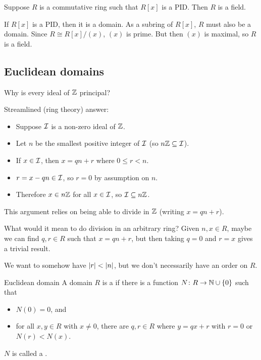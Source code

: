 \documentclass[12pt,letterpaper]{report}
\begin{document}
\begin{cor}{}{}
  Suppose $R$ is a commutative ring such that $R[x]$ is a PID.
  Then $R$ is a field.
\end{cor}

\begin{thmproof}
  If $R[x]$ is a PID, then it is a domain.
  As a subring of $R[x]$, $R$ must also be a domain.
  Since $R \cong R[x]/(x)$, $(x)$ is prime.
  But then $(x)$ is maximal, so $R$ is a field.
\end{thmproof}

\pagebreak
\subsection{Euclidean domains}

Why is every ideal of $\mathbb{Z}$ principal?

Streamlined (ring theory) answer:
\begin{itemize}
  \item Suppose $\mathcal{I}$ is a non-zero ideal of $\mathbb{Z}$.
  \item Let $n$ be the smallest positive integer of $\mathcal{I}$ (so $n\mathbb{Z} \subseteq \mathcal{I}$).
  \item If $x \in \mathcal{I}$, then $x = qn + r$ where $0 \leq r < n$.
  \item $r = x - qn \in \mathcal{I}$, so $r = 0$ by assumption on $n$.
  \item Therefore $x \in n\mathbb{Z}$ for all $x \in \mathcal{I}$, so $\mathcal{I} \subseteq n\mathbb{Z}$.
\end{itemize}
This argument relies on being able to divide in $\mathbb{Z}$ (writing $x = qn + r$).

What would it mean to do division in an arbitrary ring?
Given $n, x \in R$, maybe we can find $q, r \in R$ such that $x = qn + r$, but then taking $q = 0$
and $r = x$ gives a trivial result.

We want to somehow have $\lvert r\rvert < \lvert n\rvert$, but we don't necessarily have an order on $R$.

\begin{defn}{Euclidean domain}{}
  A domain $R$ is a  if there is a function $N \colon R \to \mathbb{N} \cup \{0\}$
  such that
  \begin{itemize}
    \item $N(0) = 0$, and
    \item for all $x, y \in R$ with $x \neq 0$, there are $q, r \in R$ where $y = qx + r$ with
      $r = 0$ or $N(r) < N(x)$.
  \end{itemize}
  $N$ is called a .
\end{defn}
\end{document}
